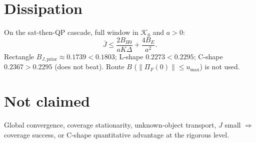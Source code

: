 \documentclass{article}
\begin{document}
\section{Dissipation}
On the sat-then-QP cascade, full window in $\mathcal K_0$ and $a>0$:
\[
\bar J\le \frac{2B_{H0}}{aK\Delta}+\frac{4B_E}{a^2}.
\]
Rectangle $B_{J,\mathrm{prior}}\approx0.1739<0.1803$; L-shape $0.2273<0.2295$; C-shape $0.2367>0.2295$ (does not beat). Route $B$ ($\|\Pi_F(0)\|\le u_{\max}$) is not used.

\section{Not claimed}
Global convergence, coverage stationarity, unknown-object transport, $J$ small $\Rightarrow$ coverage success, or C-shape quantitative advantage at the rigorous level.
\end{document}
